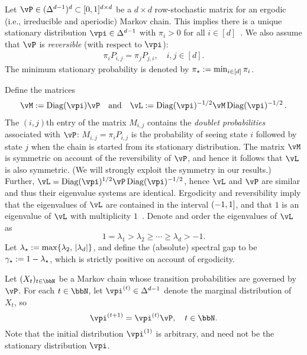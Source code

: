 Let $\vP \in (\Delta^{d-1})^d \subset [0,1]^{d \times d}$ be a $d
\times d$ row-stochastic matrix for an ergodic (i.e., irreducible and
aperiodic) Markov chain.
This implies there is a unique stationary distribution $\vpi \in
\Delta^{d-1}$ with $\pi_i > 0$ for all $i \in [d]$~\citep[Corollary
1.17]{LePeWi08}.
We also assume that $\vP$ is \emph{reversible} (with respect to
$\vpi$):
\begin{align}
\label{eq:reversibility}
  \pi_i P_{i,j} = \pi_j P_{j,i} ,
  \quad i,j \in [d] .
\end{align}
The minimum stationary probability is denoted by $\pi_{\star} := \min_{i
\in [d]} \pi_i$.

Define the matrices
\begin{align*}
\vM := \Diag(\vpi) \vP \quad \text{and} \quad
\vL := \Diag(\vpi)^{-1/2} \vM \Diag(\vpi)^{-1/2}\,.
\end{align*}
The $(i,j)$th entry of the matrix $M_{i,j}$ contains the \emph{doublet
probabilities} associated with $\vP$: $M_{i,j} = \pi_i P_{i,j}$ is the
probability of seeing state $i$ followed by state $j$ when the chain
is started from its stationary distribution.
The matrix $\vM$ is symmetric on account of the reversibility of
$\vP$, and hence it follows that $\vL$ is also symmetric.
(We will strongly exploit the symmetry in our results.)
Further, $\vL = \Diag(\vpi)^{1/2} \vP \Diag(\vpi)^{-1/2}$, hence $\vL$
and $\vP$ are similar and thus their eigenvalue systems are identical.
Ergodicity and reversibility imply that the eigenvalues of $\vL$ are
contained in the interval $(-1,1]$, and that $1$ is an
eigenvalue of $\vL$ with multiplicity $1$~\citep[Lemmas 12.1 and
12.2]{LePeWi08}.
Denote and order the eigenvalues of $\vL$ as
\[
  1 = \lambda_1 > \lambda_2 \geq \dotsb \geq \lambda_d > -1 .
\]
Let $\lambda_{\star} := \max\{ \lambda_2,\, |\lambda_d| \}$, and define the
(absolute) spectral gap to be $\gamma_{\star} := 1-\lambda_{\star}$, which is strictly
positive on account of ergodicity.

Let $(X_t)_{t\in\bbN}$ be a Markov chain whose transition
probabilities are governed by $\vP$.
For each $t \in \bbN$, let $\vpi^{(t)} \in \Delta^{d-1}$ denote the
marginal distribution of $X_t$, so
\[
  \vpi^{(t+1)} = \vpi^{(t)} \vP ,
  \quad t \in \bbN .
\]
Note that the initial distribution $\vpi^{(1)}$ is arbitrary,
and need not be the stationary distribution $\vpi$.

